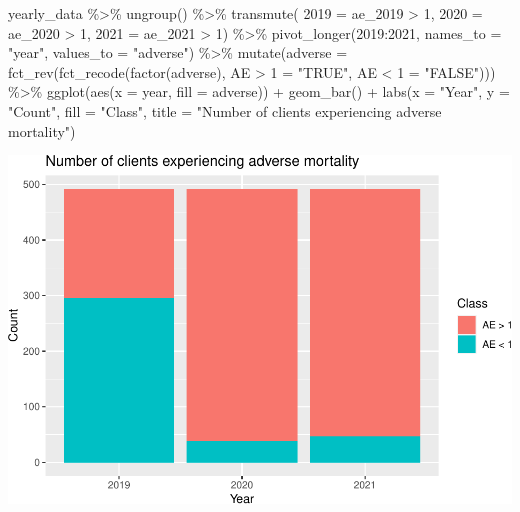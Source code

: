 \documentclass[
]{article}
\newenvironment{Shaded}{\begin{snugshade}}{\end{snugshade}}
\newcommand{\AttributeTok}[1]{\textcolor[rgb]{0.77,0.63,0.00}{#1}}
\newcommand{\DecValTok}[1]{\textcolor[rgb]{0.00,0.00,0.81}{#1}}
\newcommand{\FunctionTok}[1]{\textcolor[rgb]{0.00,0.00,0.00}{#1}}
\newcommand{\NormalTok}[1]{#1}
\newcommand{\OtherTok}[1]{\textcolor[rgb]{0.56,0.35,0.01}{#1}}
\newcommand{\SpecialCharTok}[1]{\textcolor[rgb]{0.00,0.00,0.00}{#1}}
\newcommand{\StringTok}[1]{\textcolor[rgb]{0.31,0.60,0.02}{#1}}
\begin{document}
\begin{Shaded}
\begin{Highlighting}[]
\NormalTok{yearly\_data }\SpecialCharTok{\%\textgreater{}\%}
  \FunctionTok{ungroup}\NormalTok{() }\SpecialCharTok{\%\textgreater{}\%}
  \FunctionTok{transmute}\NormalTok{(}
    \StringTok{\textasciigrave{}}\AttributeTok{2019}\StringTok{\textasciigrave{}} \OtherTok{=}\NormalTok{ ae\_2019 }\SpecialCharTok{\textgreater{}} \DecValTok{1}\NormalTok{,}
    \StringTok{\textasciigrave{}}\AttributeTok{2020}\StringTok{\textasciigrave{}} \OtherTok{=}\NormalTok{ ae\_2020 }\SpecialCharTok{\textgreater{}} \DecValTok{1}\NormalTok{,}
    \StringTok{\textasciigrave{}}\AttributeTok{2021}\StringTok{\textasciigrave{}} \OtherTok{=}\NormalTok{ ae\_2021 }\SpecialCharTok{\textgreater{}} \DecValTok{1}\NormalTok{) }\SpecialCharTok{\%\textgreater{}\%}
  \FunctionTok{pivot\_longer}\NormalTok{(}\StringTok{\textasciigrave{}}\AttributeTok{2019}\StringTok{\textasciigrave{}}\SpecialCharTok{:}\StringTok{\textasciigrave{}}\AttributeTok{2021}\StringTok{\textasciigrave{}}\NormalTok{, }\AttributeTok{names\_to =} \StringTok{"year"}\NormalTok{, }\AttributeTok{values\_to =} \StringTok{"adverse"}\NormalTok{) }\SpecialCharTok{\%\textgreater{}\%}
  \FunctionTok{mutate}\NormalTok{(}\AttributeTok{adverse =} \FunctionTok{fct\_rev}\NormalTok{(}\FunctionTok{fct\_recode}\NormalTok{(}\FunctionTok{factor}\NormalTok{(adverse), }\StringTok{\textasciigrave{}}\AttributeTok{AE \textgreater{} 1}\StringTok{\textasciigrave{}} \OtherTok{=} \StringTok{"TRUE"}\NormalTok{, }
    \StringTok{\textasciigrave{}}\AttributeTok{AE \textless{} 1}\StringTok{\textasciigrave{}} \OtherTok{=} \StringTok{"FALSE"}\NormalTok{))) }\SpecialCharTok{\%\textgreater{}\%}
  \FunctionTok{ggplot}\NormalTok{(}\FunctionTok{aes}\NormalTok{(}\AttributeTok{x =}\NormalTok{ year, }\AttributeTok{fill =}\NormalTok{ adverse)) }\SpecialCharTok{+} \FunctionTok{geom\_bar}\NormalTok{() }\SpecialCharTok{+}
  \FunctionTok{labs}\NormalTok{(}\AttributeTok{x =} \StringTok{"Year"}\NormalTok{, }\AttributeTok{y =} \StringTok{"Count"}\NormalTok{, }\AttributeTok{fill =} \StringTok{"Class"}\NormalTok{, }
    \AttributeTok{title =} \StringTok{"Number of clients experiencing adverse mortality"}\NormalTok{)}
\end{Highlighting}
\end{Shaded}

\includegraphics{figures/report/fig-unnamed-chunk-9-1.pdf}
\end{document}
